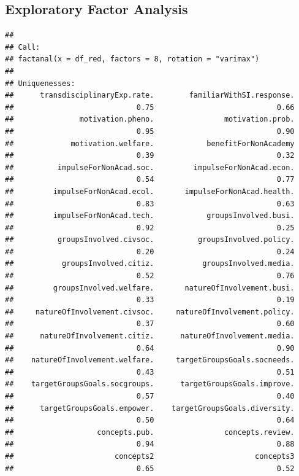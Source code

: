 \documentclass[
]{article}
\begin{document}
\hypertarget{exploratory-factor-analysis}{%
\subsection{Exploratory Factor
Analysis}\label{exploratory-factor-analysis}}

\begin{verbatim}
## 
## Call:
## factanal(x = df_red, factors = 8, rotation = "varimax")
## 
## Uniquenesses:
##      transdisciplinaryExp.rate.        familiarWithSI.response. 
##                            0.75                            0.66 
##               motivation.pheno.                motivation.prob. 
##                            0.95                            0.90 
##             motivation.welfare.            benefitForNonAcademy 
##                            0.39                            0.32 
##          impulseForNonAcad.soc.         impulseForNonAcad.econ. 
##                            0.54                            0.77 
##         impulseForNonAcad.ecol.       impulseForNonAcad.health. 
##                            0.83                            0.63 
##         impulseForNonAcad.tech.            groupsInvolved.busi. 
##                            0.92                            0.25 
##          groupsInvolved.civsoc.          groupsInvolved.policy. 
##                            0.20                            0.24 
##           groupsInvolved.citiz.           groupsInvolved.media. 
##                            0.52                            0.76 
##         groupsInvolved.welfare.       natureOfInvolvement.busi. 
##                            0.33                            0.19 
##     natureOfInvolvement.civsoc.     natureOfInvolvement.policy. 
##                            0.37                            0.60 
##      natureOfInvolvement.citiz.      natureOfInvolvement.media. 
##                            0.64                            0.90 
##    natureOfInvolvement.welfare.     targetGroupsGoals.socneeds. 
##                            0.43                            0.51 
##    targetGroupsGoals.socgroups.      targetGroupsGoals.improve. 
##                            0.57                            0.40 
##      targetGroupsGoals.empower.    targetGroupsGoals.diversity. 
##                            0.50                            0.64 
##                   concepts.pub.                concepts.review. 
##                            0.94                            0.88 
##                       concepts2                       concepts3 
##                            0.65                            0.52 

\end{verbatim}
\end{document}
